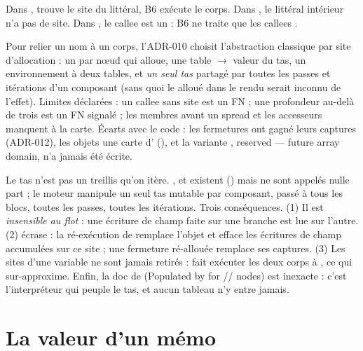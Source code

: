 Dans ,  trouve le site du littéral, B6
exécute le corps. Dans , le littéral intérieur n'a pas de site.
Dans , le callee est un  : B6 ne traite que
les callees .

\begin{decision}
  Pour relier un nom à un corps, l'ADR-010 choisit l'abstraction classique
  par site d'allocation : un  par nœud qui alloue, une table
   $\to$ valeur du tas, un environnement à deux tables, et
  \emph{un seul tas} partagé par toutes les passes et itérations d'un
  composant (sans quoi le  alloué dans le rendu serait inconnu de
  l'effet). Limites déclarées : un callee  sans site est un FN ;
  une profondeur au-delà de trois est un FN signalé ; les membres avant un
  spread et les accesseurs manquent à la carte. Écarts avec le code : les
  fermetures ont gagné leurs captures (ADR-012), les objets une carte
  d' (), et la variante ,
  \og reserved --- future array domain\fg{}, n'a jamais été écrite.
\end{decision}

\begin{piege}
  Le tas n'est pas un treillis qu'on itère. ,
   et  existent
  () mais ne sont appelés nulle part ;
  le moteur manipule un seul tas mutable par composant, passé à tous les
  blocs, toutes les passes, toutes les itérations. Trois conséquences.
  (1) Il est \emph{insensible au flot} : une écriture de champ faite sur une
  branche est lue sur l'autre. (2)  écrase : la ré-exécution de
   remplace l'objet et efface les écritures de champ
  accumulées sur ce site ; une fermeture ré-allouée remplace ses captures.
  (3) Les sites d'une variable ne sont jamais retirés :
   fait exécuter les deux corps à
  , ce qui sur-approxime. Enfin, la doc de 
  (\og Populated by  for //
  nodes\fg{}) est inexacte : c'est l'interpréteur qui peuple le tas, et aucun
  tableau n'y entre jamais.
\end{piege}

\section{La valeur d'un mémo}
\label{sec:transfert-stores-memo}

